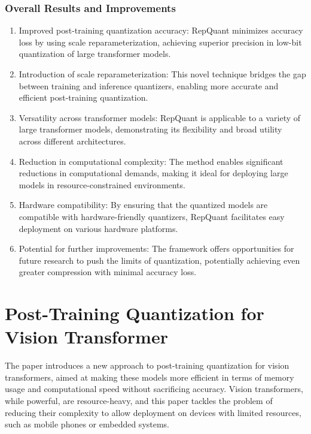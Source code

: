 \documentclass{report}
\begin{document}
	
	\subsection{Overall Results and Improvements}
	\begin{enumerate}
		\item 
		Improved post-training quantization accuracy: RepQuant minimizes accuracy loss by using scale reparameterization, achieving superior precision in low-bit quantization of large transformer models.
		
		\item
		Introduction of scale reparameterization: This novel technique bridges the gap between training and inference quantizers, enabling more accurate and efficient post-training quantization.
		
		\item
		Versatility across transformer models: RepQuant is applicable to a variety of large transformer models, demonstrating its flexibility and broad utility across different architectures.
		
		\item
		Reduction in computational complexity: The method enables significant reductions in computational demands, making it ideal for deploying large models in resource-constrained environments.
		
		\item
		Hardware compatibility: By ensuring that the quantized models are compatible with hardware-friendly quantizers, RepQuant facilitates easy deployment on various hardware platforms.
		
		\item
		Potential for further improvements: The framework offers opportunities for future research to push the limits of quantization, potentially achieving even greater compression with minimal accuracy loss.
	\end{enumerate}
	
	
	
	
	
	
	
	
	
	
	
	
	\chapter{Post-Training Quantization for Vision Transformer \cite{DBLP:journals/corr/abs-2106-14156}}
	The paper introduces a new approach to post-training quantization for vision transformers, aimed at making these models more efficient in terms of memory usage and computational speed without sacrificing accuracy. Vision transformers, while powerful, are resource-heavy, and this paper tackles the problem of reducing their complexity to allow deployment on devices with limited resources, such as mobile phones or embedded systems.
	
\end{document}
